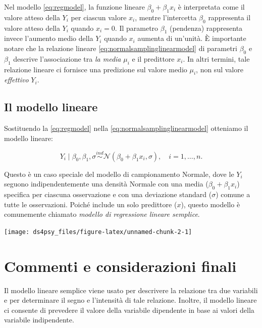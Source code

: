\documentclass[
  11pt,
]{krantz}
\begin{document}
Nel modello \eqref{eq:regmodel}, la funzione lineare \(\beta_0 + \beta_ 1 x_i\) è interpretata come il valore atteso della \(Y_i\) per ciascun valore \(x_i\), mentre l'intercetta \(\beta_0\) rappresenta il valore atteso della \(Y_i\) quando \(x_i = 0\). Il parametro \(\beta_ 1\) (pendenza) rappresenta invece l'aumento medio della \(Y_i\) quando \(x_i\) aumenta di un'unità. È importante notare che la relazione lineare \eqref{eq:normalsamplinglinearmodel} di parametri \(\beta_0\) e \(\beta_ 1\) descrive l'associazione tra \emph{la media} \(\mu_i\) e il predittore \(x_i\). In altri termini, tale relazione lineare ci fornisce una predizione sul valore medio \(\mu_i\), non sul valore \emph{effettivo} \(Y_i\).

\hypertarget{il-modello-lineare}{%
\subsection{Il modello lineare}\label{il-modello-lineare}}

Sostituendo la \eqref{eq:regmodel} nella \eqref{eq:normalsamplinglinearmodel} otteniamo il modello lineare:

\begin{equation}
Y_i \mid \beta_0, \beta_ 1, \sigma \stackrel{ind}{\sim} \mathcal{N}(\beta_0 + \beta_ 1 x_i, \sigma), \quad i = 1, \dots, n.
\label{eq:samplinglinearmodel}
\end{equation}

Questo è un caso speciale del modello di campionamento Normale, dove le \(Y_i\) seguono indipendentemente una densità Normale con una media (\(\beta_0 + \beta_ 1 x_i\)) specifica per ciascuna osservazione e con una deviazione standard (\(\sigma\)) comune a tutte le osservazioni. Poiché include un solo predittore (\(x\)), questo modello è comunemente chiamato \emph{modello di regressione lineare semplice}.

\begin{center}\texttt{[image: ds4psy\_files/figure-latex/unnamed-chunk-2-1]} \end{center}

\hypertarget{commenti-e-considerazioni-finali}{%
\section*{Commenti e considerazioni finali}\label{commenti-e-considerazioni-finali}}


Il modello lineare semplice viene usato per descrivere la relazione tra due variabili e per determinare il segno e l'intensità di tale relazione. Inoltre, il modello lineare ci consente di prevedere il valore della variabile dipendente in base ai valori della variabile indipendente.
\end{document}
